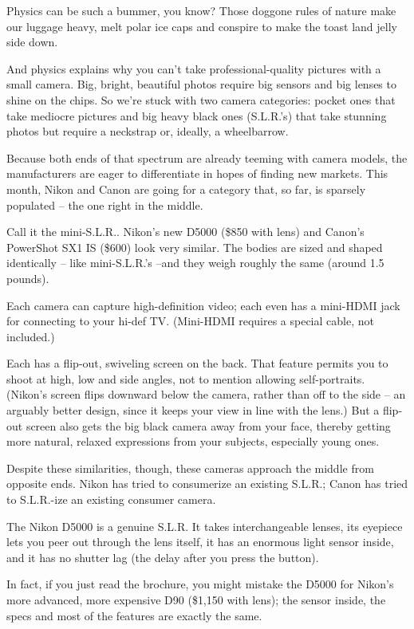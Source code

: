 \documentclass[12pt,a4paper,onecolumn]{article}
\begin{document}
Physics can be such a bummer, you know? Those doggone rules of nature make our luggage heavy, melt
polar ice caps and conspire to make the toast land jelly side down.

And physics explains why you can't take professional-quality pictures with a small camera. Big,
bright, beautiful photos require big sensors and big lenses to shine on the chips. So we're stuck
with two camera categories: pocket ones that take mediocre pictures and big heavy black ones
(S.L.R.'s) that take stunning photos but require a neckstrap or, ideally, a wheelbarrow.

Because both ends of that spectrum are already teeming with camera models, the manufacturers are
eager to differentiate in hopes of finding new markets. This month, Nikon and Canon are going for a
category that, so far, is sparsely populated -- the one right in the middle.

Call it the mini-S.L.R.. Nikon's new D5000 (\$850 with lens) and Canon's PowerShot SX1 IS (\$600)
look very similar. The bodies are sized and shaped identically -- like mini-S.L.R.'s --and they
weigh roughly the same (around 1.5 pounds).

Each camera can capture high-definition video; each even has a mini-HDMI jack for connecting to your
hi-def TV. (Mini-HDMI requires a special cable, not included.)

Each has a flip-out, swiveling screen on the back. That feature permits you to shoot at high, low
and side angles, not to mention allowing self-portraits. (Nikon's screen flips downward below the
camera, rather than off to the side -- an arguably better design, since it keeps your view in line
with the lens.) But a flip-out screen also gets the big black camera away from your face, thereby
getting more natural, relaxed expressions from your subjects, especially young ones.

Despite these similarities, though, these cameras approach the middle from opposite ends. Nikon has
tried to consumerize an existing S.L.R.; Canon has tried to S.L.R.-ize an existing consumer camera.

The Nikon D5000 is a genuine S.L.R. It takes interchangeable lenses, its eyepiece lets you peer out
through the lens itself, it has an enormous light sensor inside, and it has no shutter lag (the
delay after you press the button).

In fact, if you just read the brochure, you might mistake the D5000 for Nikon's more advanced, more
expensive D90 (\$1,150 with lens); the sensor inside, the specs and most of the features are exactly
the same.
\end{document}
